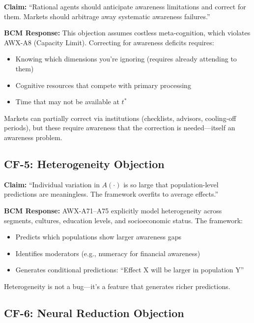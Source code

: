 \begin{tcolorbox}[colback=red!5!white, colframe=red!75!black, title=Objection]
\textbf{Claim:} ``Rational agents should anticipate awareness limitations and correct for them. Markets should arbitrage away systematic awareness failures.''
\end{tcolorbox}

\textbf{BCM Response:} This objection assumes costless meta-cognition, which violates AWX-A8 (Capacity Limit). Correcting for awareness deficits requires:
\begin{itemize}[nosep]
    \item Knowing which dimensions you're ignoring (requires already attending to them)
    \item Cognitive resources that compete with primary processing
    \item Time that may not be available at $t^*$
\end{itemize}
Markets can partially correct via institutions (checklists, advisors, cooling-off periods), but these require awareness that the correction is needed---itself an awareness problem.

\subsection{CF-5: Heterogeneity Objection}

\begin{tcolorbox}[colback=red!5!white, colframe=red!75!black, title=Objection]
\textbf{Claim:} ``Individual variation in $A(\cdot)$ is so large that population-level predictions are meaningless. The framework overfits to average effects.''
\end{tcolorbox}

\textbf{BCM Response:} AWX-A71--A75 explicitly model heterogeneity across segments, cultures, education levels, and socioeconomic status. The framework:
\begin{itemize}[nosep]
    \item Predicts which populations show larger awareness gaps
    \item Identifies moderators (e.g., numeracy for financial awareness)
    \item Generates conditional predictions: ``Effect X will be larger in population Y''
\end{itemize}
Heterogeneity is not a bug---it's a feature that generates richer predictions.

\subsection{CF-6: Neural Reduction Objection}

